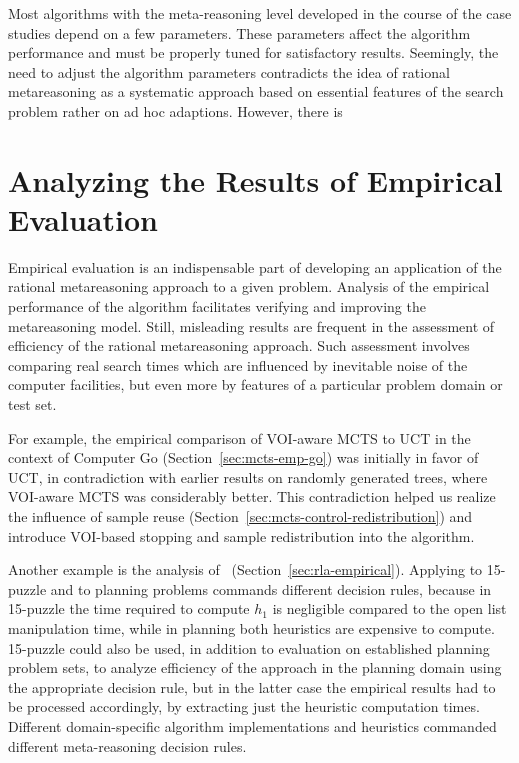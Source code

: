 Most algorithms with the meta-reasoning level developed in the course
of the case studies depend on a few parameters. These parameters
affect the algorithm performance and must be properly tuned for
satisfactory results. Seemingly, the need to adjust the algorithm
parameters contradicts the idea of rational metareasoning as a
systematic approach based on essential features of the search problem
rather on ad hoc adaptions. However, there is 

\section{Analyzing the Results of Empirical Evaluation}

Empirical evaluation is an indispensable part of developing an
application of the rational metareasoning approach to a given
problem. Analysis of the empirical performance of the algorithm
facilitates verifying and improving the metareasoning model.  Still,
misleading results are frequent in the assessment of efficiency of the
rational metareasoning approach. Such assessment involves comparing
real search times which are influenced by inevitable noise of the
computer facilities, but even more by features of a particular problem
domain or test set. 

For example, the empirical comparison of VOI-aware MCTS
to UCT in the context of Computer Go (Section~\ref{sec:mcts-emp-go})
was initially in favor of UCT, in contradiction with earlier results
on randomly generated trees, where VOI-aware MCTS was considerably
better. This contradiction helped us realize the influence of sample
reuse (Section~\ref{sec:mcts-control-redistribution}) and
introduce VOI-based stopping and sample redistribution into the
algorithm.

Another example is the analysis of
\rationallazyastar~(Section~\ref{sec:rla-empirical}). Applying
\rationallazyastar to 15-puzzle and to planning problems commands
different decision rules, because in 15-puzzle the time required to
compute $h_1$ is negligible compared to the open list manipulation time,
while in planning both heuristics are expensive to compute. 15-puzzle
could also be used, in addition to evaluation on established planning
problem sets, to analyze efficiency of the approach  in the
planning domain using the appropriate decision rule, but in the latter
case the empirical results had to be processed accordingly,
by extracting just the heuristic computation times. Different
domain-specific algorithm implementations and heuristics commanded
different meta-reasoning decision rules.
